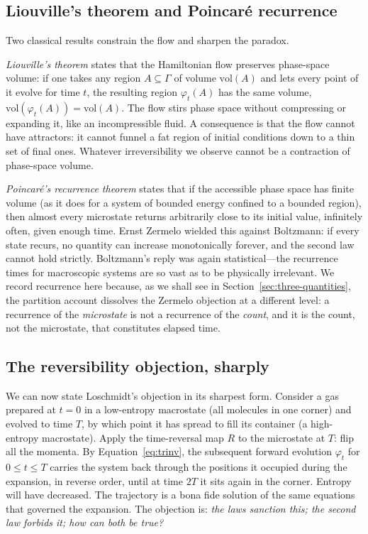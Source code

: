 \documentclass[11pt,a4paper]{article}
\theoremstyle{thmstyle}
\theoremstyle{definition}
\theoremstyle{remark}
\begin{document}
\subsection{Liouville's theorem and Poincar\'e recurrence}
\label{sec:liouville-poincare}

Two classical results constrain the flow and sharpen the paradox.

\emph{Liouville's theorem} \citep{liouville1838} states that the
Hamiltonian flow preserves phase-space volume: if one takes any region
$A\subseteq\Gamma$ of volume $\mathrm{vol}(A)$ and lets every point of it
evolve for time $t$, the resulting region $\varphi_{t}(A)$ has the same
volume, $\mathrm{vol}(\varphi_{t}(A))=\mathrm{vol}(A)$. The flow stirs
phase space without compressing or expanding it, like an
incompressible fluid. A consequence is that the flow cannot have
attractors: it cannot funnel a fat region of initial conditions down to
a thin set of final ones. Whatever irreversibility we observe cannot be
a contraction of phase-space volume.

\emph{Poincar\'e's recurrence theorem} \citep{poincare1890} states that
if the accessible phase space has finite volume (as it does for a system
of bounded energy confined to a bounded region), then almost every
microstate returns arbitrarily close to its initial value, infinitely
often, given enough time. Ernst Zermelo \citep{zermelo1896} wielded this
against Boltzmann: if every state recurs, no quantity can increase
monotonically forever, and the second law cannot hold strictly.
Boltzmann's reply \citep{boltzmann1896} was again statistical---the
recurrence times for macroscopic systems are so vast as to be physically
irrelevant. We record recurrence here because, as we shall see in
Section~\ref{sec:three-quantities}, the partition account dissolves the
Zermelo objection at a different level: a recurrence of the
\emph{microstate} is not a recurrence of the \emph{count}, and it is the
count, not the microstate, that constitutes elapsed time.

\subsection{The reversibility objection, sharply}
\label{sec:objection-sharp}

We can now state Loschmidt's objection in its sharpest form. Consider a
gas prepared at $t=0$ in a low-entropy macrostate (all molecules in one
corner) and evolved to time $T$, by which point it has spread to fill its
container (a high-entropy macrostate). Apply the time-reversal map $R$ to
the microstate at $T$: flip all the momenta. By
Equation~\eqref{eq:trinv}, the subsequent forward evolution
$\varphi_{t}$ for $0\le t\le T$ carries the system back through the
positions it occupied during the expansion, in reverse order, until at
time $2T$ it sits again in the corner. Entropy will have decreased. The
trajectory is a bona fide solution of the same equations that governed
the expansion. The objection is: \emph{the laws sanction this; the
second law forbids it; how can both be true?}
\end{document}
